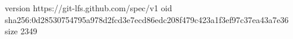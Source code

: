 version https://git-lfs.github.com/spec/v1
oid sha256:0d28530754795a978d2fcd3e7ecd86edc208f479c423a1f3ef97c37ea43a7e36
size 2349
